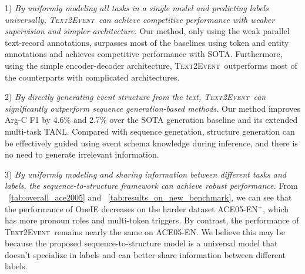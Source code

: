 \documentclass[11pt,a4paper]{article}
\newcommand\modelname{\textsc{Text2Event}}
\begin{document}
1) \textit{By uniformly modeling all tasks in a single model and predicting labels universally, \modelname\, can achieve competitive performance with weaker supervision and simpler architecture.}
Our method, only using the weak parallel text-record annotations, surpasses most of the baselines using token and entity annotations and achieves competitive performance with SOTA.
Furthermore, using the simple encoder-decoder architecture, \modelname\, outperforms most of the counterparts with complicated architectures.

2) \textit{By directly generating event structure from the text, \modelname\, can significantly outperform sequence generation-based methods.}
Our method improves Arg-C F1 by 4.6\% and 2.7\% over the SOTA generation baseline and its extended multi-task TANL.
Compared with sequence generation, structure generation can be effectively guided using event schema knowledge during inference, and there is no need to generate irrelevant information.

3) \textit{By uniformly modeling and sharing information between different tasks and labels, the sequence-to-structure framework can achieve robust performance. }
From \tablename~\ref{tab:overall_ace2005} and \tablename~\ref{tab:results_on_new_benchmark}, we can see that the performance of OneIE decreases on the harder dataset ACE05-EN$^{+}$, which has more pronoun roles and multi-token triggers.
By contrast, the performance of \modelname\, remains nearly the same on ACE05-EN.
We believe this may be because the proposed sequence-to-structure model is a universal model that doesn't specialize in labels and can better share information between different labels.
\end{document}
